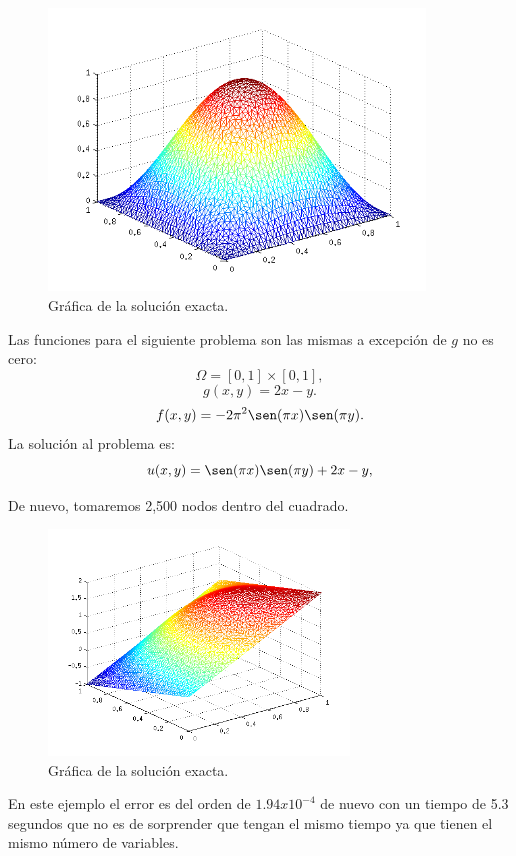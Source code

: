 \documentclass[12pt,spanish,oneside]{book}
\theoremstyle{plain}
\numberwithin{equation}{chapter}
\theoremstyle{definition}
\theoremstyle{remark}
\begin{document}
\begin{figure}[H]
\centering
\includegraphics[width=10cm]{img/u1a.png}
\caption{Gráfica de la solución exacta.}
\end{figure}

Las funciones para el siguiente problema son las mismas a excepción de $g$ no es cero: 
\[\Omega =[0,1]\times[0,1],\]\[g(x,y)=2x-y.\]\[ f(x,y) = - 2 \pi ^2 \sen(\pi x)\sen(\pi y).\]
La solución al problema es: \[ u(x,y)=\sen(\pi x)\sen(\pi y)+2x-y,\]

De nuevo, tomaremos 2,500 nodos dentro del cuadrado.
\begin{figure}[H]
\centering
\includegraphics[width=8cm]{img/u2r.png}
\caption{Gráfica de la solución exacta.}
\end{figure}

En este ejemplo el error es del orden de $1.94x10^{-4}$ de nuevo con un tiempo de 5.3 segundos que no es de sorprender que tengan el mismo tiempo ya que tienen el mismo número de variables.
\end{document}
